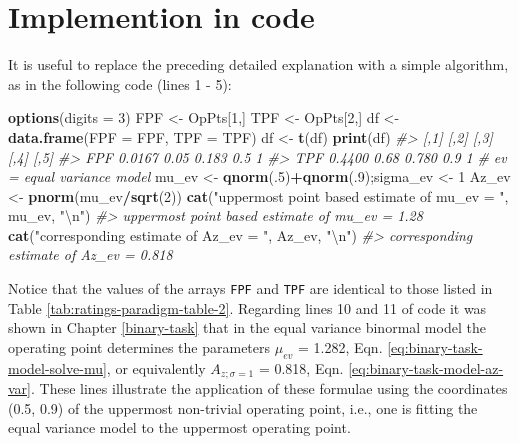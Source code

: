 \documentclass[
]{book}
\newenvironment{Shaded}{\begin{snugshade}}{\end{snugshade}}
\newcommand{\CharTok}[1]{\textcolor[rgb]{0.31,0.60,0.02}{#1}}
\newcommand{\CommentTok}[1]{\textcolor[rgb]{0.56,0.35,0.01}{\textit{#1}}}
\newcommand{\DataTypeTok}[1]{\textcolor[rgb]{0.13,0.29,0.53}{#1}}
\newcommand{\DecValTok}[1]{\textcolor[rgb]{0.00,0.00,0.81}{#1}}
\newcommand{\KeywordTok}[1]{\textcolor[rgb]{0.13,0.29,0.53}{\textbf{#1}}}
\newcommand{\NormalTok}[1]{#1}
\newcommand{\OperatorTok}[1]{\textcolor[rgb]{0.81,0.36,0.00}{\textbf{#1}}}
\newcommand{\StringTok}[1]{\textcolor[rgb]{0.31,0.60,0.02}{#1}}
\begin{document}
\hypertarget{ratings-task-code}{%
\section{Implemention in code}\label{ratings-task-code}}

It is useful to replace the preceding detailed explanation with a simple algorithm, as in the following code (lines 1 - 5):

\begin{Shaded}
\begin{Highlighting}[numbers=left,,]
\KeywordTok{options}\NormalTok{(}\DataTypeTok{digits =} \DecValTok{3}\NormalTok{)}
\NormalTok{FPF <-}\StringTok{ }\NormalTok{OpPts[}\DecValTok{1}\NormalTok{,]}
\NormalTok{TPF <-}\StringTok{ }\NormalTok{OpPts[}\DecValTok{2}\NormalTok{,]}
\NormalTok{df <-}\StringTok{ }\KeywordTok{data.frame}\NormalTok{(}\DataTypeTok{FPF =}\NormalTok{ FPF, }\DataTypeTok{TPF =}\NormalTok{ TPF)}
\NormalTok{df <-}\StringTok{ }\KeywordTok{t}\NormalTok{(df)}
\KeywordTok{print}\NormalTok{(df)}
\CommentTok{#>       [,1] [,2]  [,3] [,4] [,5]}
\CommentTok{#> FPF 0.0167 0.05 0.183  0.5    1}
\CommentTok{#> TPF 0.4400 0.68 0.780  0.9    1}
\CommentTok{# ev = equal variance model}
\NormalTok{mu_ev <-}\StringTok{ }\KeywordTok{qnorm}\NormalTok{(.}\DecValTok{5}\NormalTok{)}\OperatorTok{+}\KeywordTok{qnorm}\NormalTok{(.}\DecValTok{9}\NormalTok{);sigma_ev <-}\StringTok{ }\DecValTok{1}
\NormalTok{Az_ev <-}\StringTok{ }\KeywordTok{pnorm}\NormalTok{(mu_ev}\OperatorTok{/}\KeywordTok{sqrt}\NormalTok{(}\DecValTok{2}\NormalTok{))}
\KeywordTok{cat}\NormalTok{(}\StringTok{"uppermost point based estimate of mu_ev = "}\NormalTok{, mu_ev, }\StringTok{"}\CharTok{\textbackslash{}n}\StringTok{"}\NormalTok{)}
\CommentTok{#> uppermost point based estimate of mu_ev =  1.28}
\KeywordTok{cat}\NormalTok{(}\StringTok{"corresponding estimate of Az_ev = "}\NormalTok{, Az_ev, }\StringTok{"}\CharTok{\textbackslash{}n}\StringTok{"}\NormalTok{)}
\CommentTok{#> corresponding estimate of Az_ev =  0.818}
\end{Highlighting}
\end{Shaded}

Notice that the values of the arrays \texttt{FPF} and \texttt{TPF} are identical to those listed in Table \ref{tab:ratings-paradigm-table-2}. Regarding lines 10 and 11 of code it was shown in Chapter \ref{binary-task} that in the equal variance binormal model the operating point determines the parameters \(\mu_{ev}\) = 1.282, Eqn. \eqref{eq:binary-task-model-solve-mu}, or equivalently \(A_{z;\sigma = 1}\) = 0.818, Eqn. \eqref{eq:binary-task-model-az-var}. These lines illustrate the application of these formulae using the coordinates (0.5, 0.9) of the uppermost non-trivial operating point, i.e., one is fitting the equal variance model to the uppermost operating point.
\end{document}
